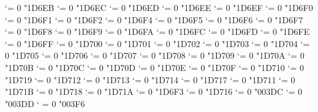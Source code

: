 \Umathcode `\Κ = 0 \normalfam "1D6EB
\Umathcode `\Λ = 0 \normalfam "1D6EC
\Umathcode `\Μ = 0 \normalfam "1D6ED
\Umathcode `\Ν = 0 \normalfam "1D6EE
\Umathcode `\Ξ = 0 \normalfam "1D6EF
\Umathcode `\Ο = 0 \normalfam "1D6F0
\Umathcode `\Π = 0 \normalfam "1D6F1
\Umathcode `\Ρ = 0 \normalfam "1D6F2
\Umathcode `\Σ = 0 \normalfam "1D6F4
\Umathcode `\Τ = 0 \normalfam "1D6F5
\Umathcode `\Υ = 0 \normalfam "1D6F6
\Umathcode `\Φ = 0 \normalfam "1D6F7
\Umathcode `\Χ = 0 \normalfam "1D6F8
\Umathcode `\Ψ = 0 \normalfam "1D6F9
\Umathcode `\Ω = 0 \normalfam "1D6FA
\Umathcode `\α = 0 \normalfam "1D6FC
\Umathcode `\β = 0 \normalfam "1D6FD
\Umathcode `\γ = 0 \normalfam "1D6FE
\Umathcode `\δ = 0 \normalfam "1D6FF
\Umathcode `\ε = 0 \normalfam "1D700
\Umathcode `\ζ = 0 \normalfam "1D701
\Umathcode `\η = 0 \normalfam "1D702
\Umathcode `\θ = 0 \normalfam "1D703
\Umathcode `\ι = 0 \normalfam "1D704
\Umathcode `\κ = 0 \normalfam "1D705
\Umathcode `\λ = 0 \normalfam "1D706
\Umathcode `\μ = 0 \normalfam "1D707
\Umathcode `\ν = 0 \normalfam "1D708
\Umathcode `\ξ = 0 \normalfam "1D709
\Umathcode `\ο = 0 \normalfam "1D70A
\Umathcode `\π = 0 \normalfam "1D70B
\Umathcode `\ρ = 0 \normalfam "1D70C
\Umathcode `\ς = 0 \normalfam "1D70D
\Umathcode `\σ = 0 \normalfam "1D70E
\Umathcode `\τ = 0 \normalfam "1D70F
\Umathcode `\υ = 0 \normalfam "1D710
\Umathcode `\φ = 0 \normalfam "1D719
\Umathcode `\χ = 0 \normalfam "1D712
\Umathcode `\ψ = 0 \normalfam "1D713
\Umathcode `\ω = 0 \normalfam "1D714
\Umathcode `\ϑ = 0 \normalfam "1D717
\Umathcode `\ϕ = 0 \normalfam "1D711
\Umathcode `\ϖ = 0 \normalfam "1D71B
\Umathcode `\ϰ = 0 \normalfam "1D718
\Umathcode `\ϱ = 0 \normalfam "1D71A
\Umathcode `\ϴ = 0 \normalfam "1D6F3
\Umathcode `\ϵ = 0 \normalfam "1D716
\Umathcode `\Ϝ = 0 \normalfam "003DC
\Umathcode `\ϝ = 0 \normalfam "003DD
\Umathcode `\϶ = 0 \normalfam "003F6


\let\itbf=\bfit
\let\itsf=\sfit
\let\bfsf=\sfbf
\let\sfitbf=\sfbfit
\let\bfsfit=\sfbfit
\let\bfitsf=\sfbfit
\let\itsfbf=\sfbfit
\let\itbfsf=\sfbfit
\let\cal=\scr
\let\bfscr=\scrbf
\let\bffrak=\frakbf
\let\itbb=\bbit

\let\Alpha=Α      \let\Beta=Β     \let\Gamma=Γ    \let\Delta=Δ
\let\Epsilon=Ε    \let\Zeta=Ζ     \let\Eta=Η      \let\Theta=Θ
\let\Iota=Ι       \let\Kappa=Κ    \let\Lambda=Λ   \let\Mu=Μ
\let\Nu=Ν         \let\Xi=Ξ       \let\Omicron=Ο  \let\Pi=Π
\let\Rho=Ρ        \let\Sigma=Σ    \let\Tau=Τ      \let\Upsilon=Υ
\let\Phi=Φ        \let\Chi=Χ      \let\Psi=Ψ      \let\Omega=Ω
\let\alpha=α      \let\beta=β     \let\gamma=γ    \let\delta=δ
\let\varepsilon=ε \let\zeta=ζ     \let\eta=η      \let\theta=θ
\let\iota=ι       \let\kappa=κ    \let\lambda=λ   \let\mu=μ
\let\nu=ν         \let\xi=ξ       \let\omicron=ο  \let\pi=π
\let\rho=ρ        \let\varsigma=ς \let\sigma=σ    \let\tau=τ
\let\upsilon=υ    \let\phi=φ      \let\chi=χ      \let\psi=ψ
\let\omega=ω      \let\vartheta=ϑ \let\varphi=ϕ   \let\varpi=ϖ
\let\varkappa=ϰ   \let\varrho=ϱ   \let\varTheta=ϴ \let\epsilon=ϵ
\let\partial=∂    \let\nabla=∇

